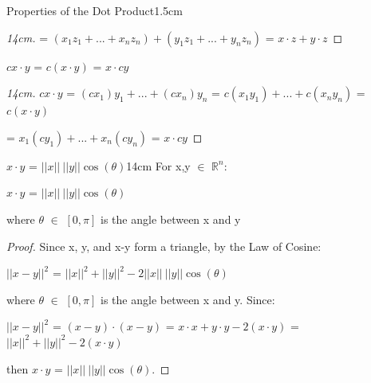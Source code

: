 \begin{ltheorem}{Properties of the Dot Product}{1.5cm}
\begin{proof}[14cm]
                \hspace{1.6cm}
                = $(x_1z_1 + ... + x_nz_n) + (y_1z_1 + ... + y_nz_n)$
                = $x \cdot z + y \cdot z$
            \end{proof}

        \item $cx \cdot y$ = $c(x \cdot y)$ = $x \cdot cy$
        
            \begin{proof}[14cm]
                $cx \cdot y$
                = $(cx_1)y_1 + ... + (cx_n)y_n$
                = $c(x_1y_1) + ... + c(x_ny_n)$
                = $c (x \cdot y)$
                
                \hspace{0.9cm}
                = $x_1(cy_1) + ... + x_n(cy_n)$
                = $x \cdot cy$
            \end{proof}
    \end{ltheorem}

    \vspace{0.5cm}



    \begin{wtheorem}{$x \cdot y$ = $||x|| \ ||y|| \cos(\theta)$}{14cm}
        For x,y $\in$ $\mathbb{R}^n$:

        \hspace{0.5cm}
        $x \cdot y$ = $||x|| \ ||y|| \cos(\theta)$

        where $\theta$ $\in$ $[0,\pi]$ is the angle between x and y
    \end{wtheorem}

    \begin{proof}
        Since x, y, and x-y form a triangle, by the Law of Cosine:

        \hspace{0.5cm}
        $||x-y||^2$ = $||x||^2 + ||y||^2 - 2||x|| \ ||y|| \cos(\theta)$
        
        where $\theta$ $\in$ $[0,\pi]$ is the angle between x and y. Since:

        \hspace{0.5cm}
        $||x-y||^2$
        = $(x - y) \cdot (x - y)$
        = $x \cdot x + y \cdot y - 2(x \cdot y)$
        = $||x||^2 + ||y||^2 - 2(x \cdot y)$

        then $x \cdot y$ = $||x|| \ ||y|| \cos(\theta)$.
    \end{proof}

    \vspace{0.5cm}



